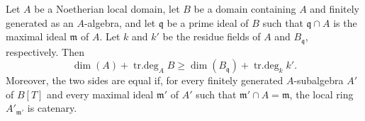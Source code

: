 \begin{theorem}
\label{IV.5.5.8}
Let $A$ be a Noetherian local domain, let $B$ be a domain containing
$A$ and finitely generated as an $A$-algebra, and let $\mathfrak q$
be a prime ideal of $B$ such that
$\mathfrak q\cap A$ is the maximal ideal $\mathfrak m$ of $A$.
Let $k$ and $k'$ be the residue fields of $A$ and
$B_{\mathfrak q}$, respectively.
Then
\begin{equation}
\dim(A)+\operatorname{tr.deg}_A B
 \geq\dim(B_{\mathfrak q})+\operatorname{tr.deg}_k k'.
\tag{5.5.8.1}\label{IV.5.5.8.1}
\end{equation}
Moreover, the two sides are equal if, for every finitely generated
$A$-subalgebra $A'$ of $B[T]$ and every maximal ideal
$\mathfrak m'$ of $A'$ such that
$\mathfrak m'\cap A=\mathfrak m$, the local ring
$A'_{\mathfrak m'}$ is catenary.
\end{theorem}


